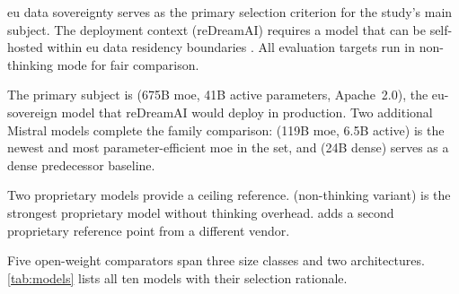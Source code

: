 \gls{eu} data sovereignty serves as the primary selection criterion for the
study's main subject. The deployment context (reDreamAI) requires a model
that can be self-hosted within \gls{eu} data residency boundaries
\parencite{2QMKF3RM}. All evaluation targets run in non-thinking mode for
fair comparison.

The primary subject is  (675B \gls{moe}, 41B
active parameters, Apache~2.0), the \gls{eu}-sovereign model that
reDreamAI would deploy in production. Two additional Mistral
models complete the family comparison: 
(119B \gls{moe}, 6.5B active) is the newest and most parameter-efficient
\gls{moe} in the set, and  (24B dense)
serves as a dense predecessor baseline.

Two proprietary models provide a ceiling reference.
 (non-thinking variant) is the strongest proprietary
model without thinking overhead.  adds a second proprietary reference point
from a different vendor.

Five open-weight comparators span three size classes and two
architectures. \autoref{tab:models} lists all ten models with their
selection rationale.

